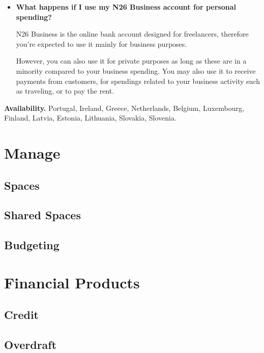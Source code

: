 \documentclass[onsided]{book}
\numberwithin{equation}{section}
\begin{document}
\begin{itemize}
    This will automatically be deposited on a monthly basis. 
    
    You don't have to take any additional steps!
    \item \textbf{What happens if I use my N26 Business account for personal spending?}
    
    N26 Business is the online bank account designed for freelancers, therefore you're expected to use it mainly for business purposes.
    
    However, you can also use it for private purposes as long as these are in a minority compared to your business spending. You may also use it to receive payments from customers, for spendings related to your business activity such as traveling, or to pay the rent.
\end{itemize}
\textbf{Availability.} Portugal, Ireland, Greece, Netherlands, Belgium, Luxembourg, Finland, Latvia, Estonia, Lithuania, Slovakia, Slovenia.


\chapter{Manage}

\section{Spaces}

\section{Shared Spaces}

\section{Budgeting}


\chapter{Financial Products}

\section{Credit}

\section{Overdraft}
\end{document}
